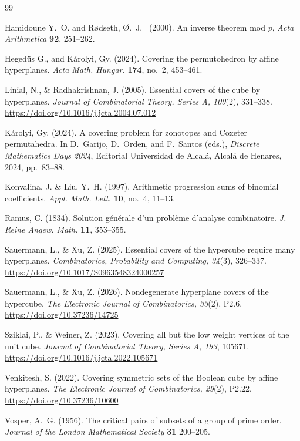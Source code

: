 \documentclass[11pt]{article}
\newcommand{\1}{\mathbf{1}}
\begin{document}
\begin{thebibliography}{99}
		
		
		Hamidoune  Y.~O. and R{\o}dseth,  \O.~J.~  (2000).
		An inverse theorem mod \(p\),
		\emph{Acta Arithmetica}
		\textbf{92}, 251--262.
		
		Heged{\"u}s G., and Károlyi, Gy. (2024).
		Covering the permutohedron by affine hyperplanes.
		\emph{Acta Math. Hungar.} \textbf{174}, no.~2, 453--461.
		
		Linial, N., \& Radhakrishnan, J. (2005).
		Essential covers of the cube by hyperplanes.
		\emph{Journal of Combinatorial Theory, Series A, 109}(2), 331--338.
		\url{https://doi.org/10.1016/j.jcta.2004.07.012}
		
		
		
		Károlyi, Gy. (2024).
		A covering problem for zonotopes and Coxeter permutahedra.
		In D.~Garijo, D.~Orden, and F.~Santos (eds.),
		\emph{Discrete Mathematics Days 2024},
		Editorial Universidad de Alcalá, Alcalá de Henares, 2024,
		pp.~83--88.
		
		
		
		Konvalina, J. \& Liu, Y.~H.  (1997).
		Arithmetic progression sums of binomial coefficients.
		\emph{Appl. Math. Lett.} \textbf{10}, no.~4, 11--13.
		
		
		Ramus,  C. (1834).
		Solution générale d'un problème d'analyse combinatoire.
		\emph{J. Reine Angew. Math.} \textbf{11}, 353--355.
		
		
		Sauermann, L., \& Xu, Z. (2025).
		Essential covers of the hypercube require many hyperplanes.
		\emph{Combinatorics, Probability and Computing, 34}(3), 326--337.
		\url{https://doi.org/10.1017/S0963548324000257}
		
		Sauermann, L., \& Xu, Z. (2026).
		Nondegenerate hyperplane covers of the hypercube.
		\emph{The Electronic Journal of Combinatorics, 33}(2), P2.6.
		\url{https://doi.org/10.37236/14725}
		
		Sziklai, P., \& Weiner, Z. (2023).
		Covering all but the low weight vertices of the unit cube.
		\emph{Journal of Combinatorial Theory, Series A, 193}, 105671.
		\url{https://doi.org/10.1016/j.jcta.2022.105671}
		
		Venkitesh, S. (2022).
		Covering symmetric sets of the Boolean cube by affine hyperplanes.
		\emph{The Electronic Journal of Combinatorics, 29}(2), P2.22.
		\url{https://doi.org/10.37236/10600}
		
		Vosper, A.~G.  (1956).
		The critical pairs of subsets of a group of prime order.
		\emph{Journal of the London Mathematical Society}
		\textbf{31} 200--205.
	\end{thebibliography}
	
\end{document}
